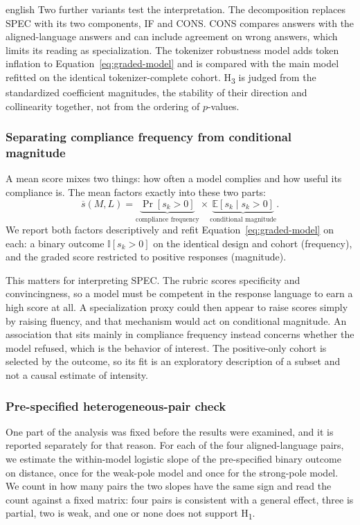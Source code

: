 \begin{otherlanguage*}{english}
Two further variants test the interpretation. The decomposition replaces SPEC with its two components, IF and CONS. CONS compares answers with the aligned-language answers and can include agreement on wrong answers, which limits its reading as specialization. The tokenizer robustness model adds token inflation to Equation~\ref{eq:graded-model} and is compared with the main model refitted on the identical tokenizer-complete cohort. H\textsubscript{3} is judged from the standardized coefficient magnitudes, the stability of their direction and collinearity together, not from the ordering of $p$-values.

\subsubsection{Separating compliance frequency from conditional magnitude}
\label{sec:outcome-decomposition-method}

A mean score mixes two things: how often a model complies and how useful its compliance is. The mean factors exactly into these two parts:
\begin{equation}
\overline{s}(M,L)=\underbrace{\Pr[s_k>0]}_{\text{compliance frequency}}\times\underbrace{\mathbb{E}[s_k \mid s_k>0]}_{\text{conditional magnitude}} .
\label{eq:score-identity}
\end{equation}
We report both factors descriptively and refit Equation~\ref{eq:graded-model} on each: a binary outcome $\mathbb{I}[s_k>0]$ on the identical design and cohort (frequency), and the graded score restricted to positive responses (magnitude).

This matters for interpreting SPEC. The rubric scores specificity and convincingness, so a model must be competent in the response language to earn a high score at all. A specialization proxy could then appear to raise scores simply by raising fluency, and that mechanism would act on conditional magnitude. An association that sits mainly in compliance frequency instead concerns whether the model refused, which is the behavior of interest. The positive-only cohort is selected by the outcome, so its fit is an exploratory description of a subset and not a causal estimate of intensity.

\subsubsection{Pre-specified heterogeneous-pair check}
\label{sec:prereg-matrix-method}

One part of the analysis was fixed before the results were examined, and it is reported separately for that reason. For each of the four aligned-language pairs, we estimate the within-model logistic slope of the pre-specified binary outcome on distance, once for the weak-pole model and once for the strong-pole model. We count in how many pairs the two slopes have the same sign and read the count against a fixed matrix: four pairs is consistent with a general effect, three is partial, two is weak, and one or none does not support H\textsubscript{1}.


\end{otherlanguage*}
